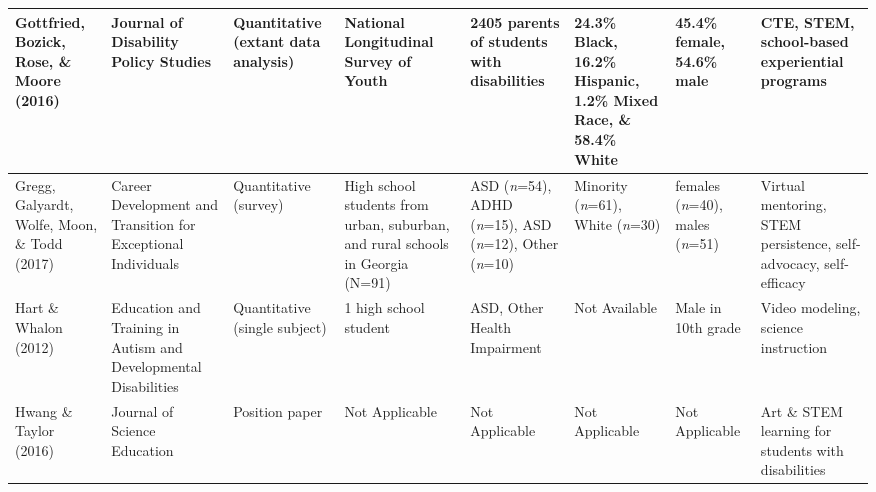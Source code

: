 \documentclass[11.5pt]{sig-alternate}
\begin{document}
\begin{@twocolumnfalse}
\begin{table}
\begin{tabular}{m{0.72in}m{0.72in}m{0.72in}m{0.72in}m{0.72in}m{0.72in}m{0.72in}m{0.72in}}
Gottfried, Bozick, Rose, \& Moore (2016)            & Journal of Disability Policy Studies                            & Quantitative (extant data analysis)   & National Longitudinal Survey of Youth                                                        & 2405 parents of students with disabilities        & 24.3\% Black, 16.2\% Hispanic, 1.2\% Mixed Race, \& 58.4\% White                                       & 45.4\% female, 54.6\% male                                       & CTE, STEM, school-based experiential programs                                                            \\ \hline
Gregg, Galyardt, Wolfe, Moon, \&  Todd (2017)        & Career Development and Transition for Exceptional Individuals   & Quantitative (survey)                 & High school students from urban, suburban, and rural schools in Georgia (N=91)               & ASD (\textit{n}=54), ADHD (\textit{n}=15), ASD (\textit{n}=12), Other (\textit{n}=10) & Minority (\textit{n}=61), White (\textit{n}=30)                                                                          & females (\textit{n}=40), males (\textit{n}=51)                                     & Virtual mentoring, STEM persistence, self-advocacy, self-efficacy                                        \\ \hline
Hart \& Whalon (2012)                                & Education and Training in Autism and Developmental Disabilities & Quantitative (single subject)         & 1 high school student                                                                        & ASD, Other Health Impairment                      &  \centering Not Available                                                                                          & Male in 10th grade                                               & Video modeling, science instruction                                                                      \\ \hline
Hwang \&  Taylor (2016)                              & Journal of Science Education                                    & Position paper                        &  \centering Not Applicable                                                                               &  \centering Not Applicable                                    &  \centering Not Applicable                                                                                         &  \centering Not Applicable                                                   & Art \& STEM learning for students with disabilities                                                      \\ \hline

\end{tabular}
\end{table}
\end{@twocolumnfalse}
\end{document}
